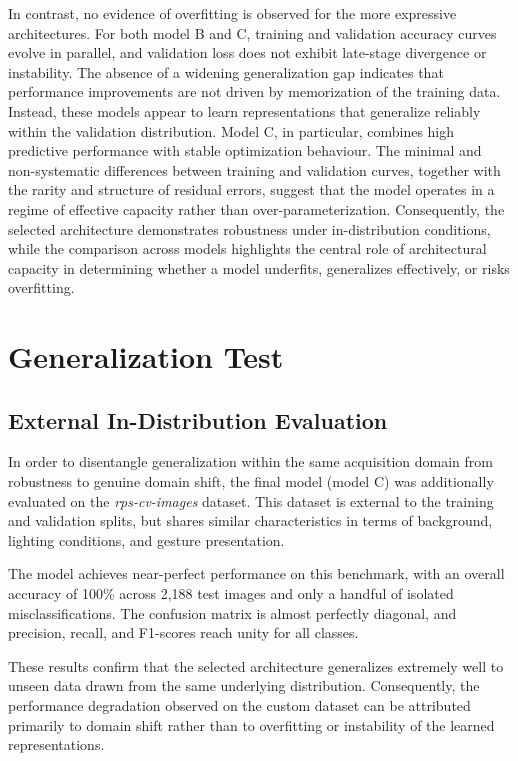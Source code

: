 \documentclass{article}
\begin{document}
In contrast, no evidence of overfitting is observed for the more
expressive architectures. For both model B and C, training and
validation accuracy curves evolve in parallel, and validation loss does
not exhibit late-stage divergence or instability. The absence of a
widening generalization gap indicates that performance improvements are
not driven by memorization of the training data. Instead, these models
appear to learn representations that generalize reliably within the
validation distribution. Model C, in particular, combines high
predictive performance with stable optimization behaviour. The minimal
and non-systematic differences between training and validation curves,
together with the rarity and structure of residual errors, suggest that
the model operates in a regime of effective capacity rather than
over-parameterization. Consequently, the selected architecture
demonstrates robustness under in-distribution conditions, while the
comparison across models highlights the central role of architectural
capacity in determining whether a model underfits, generalizes
effectively, or risks overfitting.

\section{Generalization Test}
\subsection{External In-Distribution Evaluation}

In order to disentangle generalization within the same acquisition
domain from robustness to genuine domain shift, the final model (model
C) was additionally evaluated on the \emph{rps-cv-images} dataset. This
dataset is external to the training and validation splits, but shares
similar characteristics in terms of background, lighting conditions, and
gesture presentation.

The model achieves near-perfect performance on this benchmark, with an
overall accuracy of 100\% across 2,188 test images and only a handful of
isolated misclassifications. The confusion matrix is almost perfectly
diagonal, and precision, recall, and F1-scores reach unity for all
classes.

These results confirm that the selected architecture generalizes
extremely well to unseen data drawn from the same underlying
distribution. Consequently, the performance degradation observed on the
custom dataset can be attributed primarily to domain shift rather than
to overfitting or instability of the learned representations.
\end{document}
